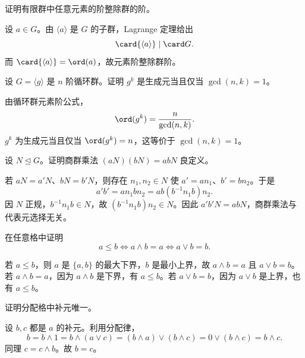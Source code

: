 \begin{exercise}[level=standard]
证明有限群中任意元素的阶整除群的阶。
\begin{solution}
设 $a\in G$。由 $\langle a\rangle$ 是 $G$ 的子群，Lagrange 定理给出
  \[
  \card{\langle a\rangle}\mid \card G.
  \]
  而 $\card{\langle a\rangle}=\ord(a)$，故元素阶整除群阶。
\end{solution}
\end{exercise}

\begin{exercise}[level=standard]
设 $G=\langle g\rangle$ 是 $n$ 阶循环群。证明 $g^k$ 是生成元当且仅当 $\gcd(n,k)=1$。
\begin{solution}
由循环群元素阶公式，
  \[
  \ord(g^k)=\frac{n}{\gcd(n,k)}.
  \]
  $g^k$ 为生成元当且仅当 $\ord(g^k)=n$，这等价于 $\gcd(n,k)=1$。
\end{solution}
\end{exercise}

\begin{exercise}[level=standard]
设 $N\trianglelefteq G$。证明商群乘法 $(aN)(bN)=abN$ 良定义。
\begin{solution}
若 $aN=a'N$、$bN=b'N$，则存在 $n_1,n_2\in N$ 使 $a'=an_1$、$b'=bn_2$。于是
  \[
  a'b'=an_1bn_2=ab(b^{-1}n_1b)n_2.
  \]
  因 $N$ 正规，$b^{-1}n_1b\in N$，故 $(b^{-1}n_1b)n_2\in N$。因此 $a'b'N=abN$，商群乘法与代表元选择无关。
\end{solution}
\end{exercise}

\begin{exercise}[level=standard]
在任意格中证明
  \[
  a\le b\Longleftrightarrow a\wedge b=a\Longleftrightarrow a\vee b=b.
  \]
\begin{solution}
若 $a\le b$，则 $a$ 是 $\{a,b\}$ 的最大下界，$b$ 是最小上界，故 $a\wedge b=a$ 且 $a\vee b=b$。若 $a\wedge b=a$，因为 $a\wedge b$ 是下界，有 $a\le b$。若 $a\vee b=b$，因为 $a\vee b$ 是上界，也有 $a\le b$。
\end{solution}
\end{exercise}

\begin{exercise}[level=standard]
证明分配格中补元唯一。
\begin{solution}
设 $b,c$ 都是 $a$ 的补元。利用分配律，
  \[
  b=b\wedge1=b\wedge(a\vee c)=(b\wedge a)\vee(b\wedge c)=0\vee(b\wedge c)=b\wedge c.
  \]
  同理 $c=c\wedge b$。故 $b=c$。
\end{solution}
\end{exercise}

